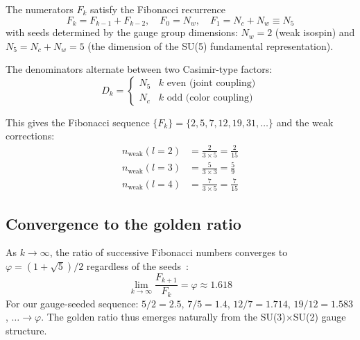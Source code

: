 ﻿\documentclass[twocolumn,preprintnumbers,amsmath,amssymb,prd]{revtex4-2}
\begin{document}
The numerators $F_k$ satisfy the Fibonacci recurrence
\begin{equation}
F_k = F_{k-1} + F_{k-2}, \quad F_0 = N_w, \quad F_1 = N_c + N_w \equiv N_5
\label{eq:fibonacci}
\end{equation}
with seeds determined by the gauge group dimensions: $N_w = 2$ (weak isospin) and $N_5 = N_c + N_w = 5$ (the dimension of the SU(5) fundamental representation).

The denominators alternate between two Casimir-type factors:
\begin{equation}
D_k = \begin{cases} N_5 & k \text{ even (joint coupling)} \\ N_c & k \text{ odd (color coupling)} \end{cases}
\label{eq:denom}
\end{equation}

This gives the Fibonacci sequence $\{F_k\} = \{2, 5, 7, 12, 19, 31, \ldots\}$ and the weak corrections:
\begin{align}
n_{\text{weak}}(l=2) &= \frac{2}{3 \times 5} = \frac{2}{15} \\
n_{\text{weak}}(l=3) &= \frac{5}{3 \times 3} = \frac{5}{9} \\
n_{\text{weak}}(l=4) &= \frac{7}{3 \times 5} = \frac{7}{15}
\end{align}

\subsection{Convergence to the golden ratio}

As $k \to \infty$, the ratio of successive Fibonacci numbers converges to $\varphi = (1+\sqrt{5})/2$ regardless of the seeds~\cite{Binet}:
\begin{equation}
\lim_{k\to\infty} \frac{F_{k+1}}{F_k} = \varphi \approx 1.618
\end{equation}
For our gauge-seeded sequence: $5/2 = 2.5$, $7/5 = 1.4$, $12/7 = 1.714$, $19/12 = 1.583$, $\ldots \to \varphi$. The golden ratio thus emerges naturally from the SU(3)$\times$SU(2) gauge structure.
\end{document}
